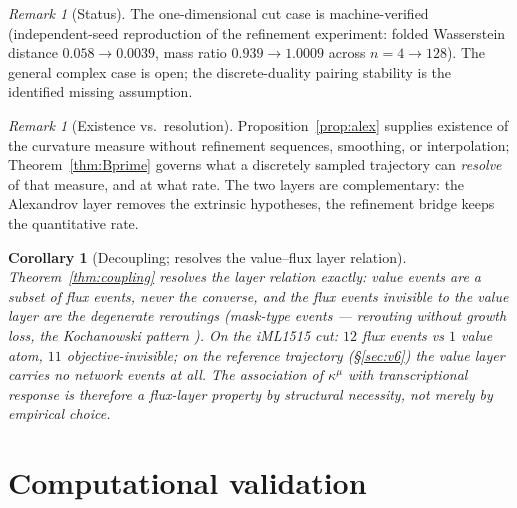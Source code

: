 \documentclass[11pt,a4paper]{article}
\theoremstyle{plain}
\newtheorem{corollary}[theorem]{Corollary}
\theoremstyle{definition}
\theoremstyle{remark}
\newtheorem{remark}[theorem]{Remark}
\newcommand{\kmu}{\kappa^{\mu}}
\begin{document}
\begin{remark}[Status]
The one-dimensional cut case is machine-verified (independent-seed
reproduction of the refinement experiment: folded Wasserstein distance
$0.058 \to 0.0039$, mass ratio $0.939 \to 1.0009$ across
$n = 4 \to 128$). The general complex case is open; the discrete-duality
pairing stability is the identified missing assumption.
\end{remark}

\begin{remark}[Existence vs.\ resolution]
Proposition~\ref{prop:alex} supplies existence of the curvature measure
without refinement sequences, smoothing, or interpolation; Theorem~\ref{thm:Bprime} governs what a discretely sampled trajectory can \emph{resolve} of that
measure, and at what rate. The two layers are complementary: the
Alexandrov layer removes the extrinsic hypotheses, the refinement
bridge keeps the quantitative rate.
\end{remark}

\begin{corollary}[Decoupling; resolves the value--flux layer
relation]\label{conj:valueflux}
Theorem~\ref{thm:coupling} resolves the layer relation exactly: value
events are a subset of flux events, never the converse, and the flux
events invisible to the value layer are the degenerate reroutings
(mask-type events --- rerouting without growth loss, the Kochanowski pattern \citep{kochanowski2013}). On the iML1515 cut: $12$ flux events vs $1$ value atom, $11$ objective-invisible; on the reference trajectory (\S\ref{sec:v6}) the
value layer carries no network events at all. The association of
$\kmu$ with transcriptional response is therefore a flux-layer
property by structural necessity, not merely by empirical choice.
\end{corollary}

\section{Computational validation}\label{sec:computational}
\end{document}
